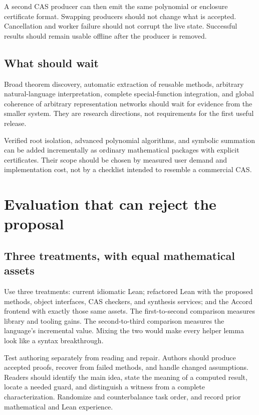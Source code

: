 \documentclass[11pt,letterpaper]{article}
\theoremstyle{definition}
\begin{document}
A second CAS producer can then emit the same polynomial or enclosure certificate
format. Swapping producers should not change what is accepted. Cancellation and
worker failure should not corrupt the live state. Successful results should remain
usable offline after the producer is removed.

\subsection{What should wait}
Broad theorem discovery, automatic extraction of reusable methods, arbitrary
natural-language interpretation, complete special-function integration, and global
coherence of arbitrary representation networks should wait for evidence from the
smaller system. They are research directions, not requirements for the first useful
release.

Verified root isolation, advanced polynomial algorithms, and symbolic summation
can be added incrementally as ordinary mathematical packages with explicit
certificates. Their scope should be chosen by measured user demand and
implementation cost, not by a checklist intended to resemble a commercial CAS.

\section{Evaluation that can reject the proposal}\label{sec:evaluation}
\subsection{Three treatments, with equal mathematical assets}
Use three treatments: current idiomatic Lean; refactored Lean with the proposed
methods, object interfaces, CAS checkers, and synthesis services; and the Accord
frontend with exactly those same assets. The first-to-second comparison measures
library and tooling gains. The second-to-third comparison measures the language's
incremental value. Mixing the two would make every helper lemma look like a syntax
breakthrough.

Test authoring separately from reading and repair. Authors should produce accepted
proofs, recover from failed methods, and handle changed assumptions. Readers should
identify the main idea, state the meaning of a computed result, locate a needed
guard, and distinguish a witness from a complete characterization. Randomize and
counterbalance task order, and record prior mathematical and Lean experience.
\end{document}
